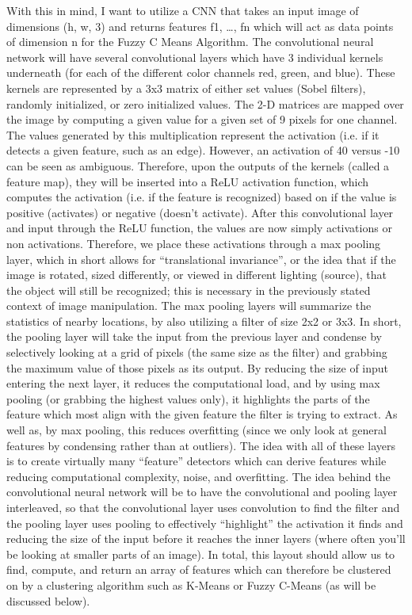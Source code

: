 \documentclass[10pt,twocolumn]{article}
\begin{document}
With this in mind, I want to utilize a CNN that takes an input image of dimensions (h, w, 3) and returns features {f1, …, fn} which will act as data points of dimension n for the Fuzzy C Means Algorithm. The convolutional neural network will have several convolutional layers which have 3 individual kernels underneath (for each of the different color channels red, green, and blue). These kernels are represented by a 3x3 matrix of either set values (Sobel filters), randomly initialized, or zero initialized values. The 2-D matrices are mapped over the image by computing a given value for a given set of 9 pixels for one channel. The values generated by this multiplication represent the activation (i.e. if it detects a given feature, such as an edge). However, an activation of 40 versus -10 can be seen as ambiguous. Therefore, upon the outputs of the kernels (called a feature map), they will be inserted into a ReLU activation function, which computes the activation (i.e. if the feature is recognized) based on if the value is positive (activates) or negative (doesn’t activate). After this convolutional layer and input through the ReLU function, the values are now simply activations or non activations. Therefore, we place these activations through a max pooling layer, which in short allows for “translational invariance”, or the idea that if the image is rotated, sized differently, or viewed in different lighting (source), that the object will still be recognized; this is necessary in the previously stated context of image manipulation. The max pooling layers will summarize the statistics of nearby locations, by also utilizing a filter of size 2x2 or 3x3. In short, the pooling layer will take the input from the previous layer and condense by selectively looking at a grid of pixels (the same size as the filter) and grabbing the maximum value of those pixels as its output. By reducing the size of input entering the next layer, it reduces the computational load, and by using max pooling (or grabbing the highest values only), it highlights the parts of the feature which most align with the given feature the filter is trying to extract. As well as, by max pooling, this reduces overfitting (since we only look at general features by condensing rather than at outliers). The idea with all of these layers is to create virtually many “feature” detectors which can derive features while reducing computational complexity, noise, and overfitting. The idea behind the convolutional neural network will be to have the convolutional and pooling layer interleaved, so that the convolutional layer uses convolution to find the filter and the pooling layer uses pooling to effectively “highlight” the activation it finds and reducing the size of the input before it reaches the inner layers (where often you’ll be looking at smaller parts of an image). In total, this layout should allow us to find, compute, and return an array of features which can therefore be clustered on by a clustering algorithm such as K-Means or Fuzzy C-Means (as will be discussed below). 
\end{document}
